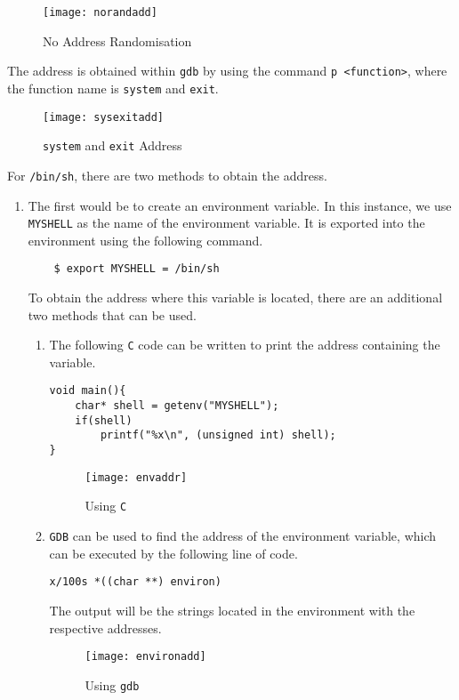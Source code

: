 \documentclass[a4paper,12pt]{article}
\begin{document}
\begin{figure}[H]
	\centering
	\texttt{[image: norandadd]}
	\caption{No Address Randomisation}
	\label{fig:norandadd}
\end{figure}
\noindent The address is obtained within \texttt{gdb} by using the command \texttt{p <function>}, where the function name is \texttt{system} and \texttt{exit}.
\begin{figure}[H]
	\centering
	\texttt{[image: sysexitadd]}
	\caption{\texttt{system} and \texttt{exit} Address}
	\label{fig:sysexitadd}
\end{figure}
For \texttt{/bin/sh}, there are two methods to obtain the address.
\begin{enumerate}
	\item The first would be to create an environment variable. In this instance, we use \texttt{MYSHELL} as the name of the environment variable. It is exported into the environment using the following command.
	\begin{verbatim}
	$ export MYSHELL = /bin/sh
	\end{verbatim}
	To obtain the address where this variable is located, there are an additional two methods that can be used.
	\begin{enumerate}
		\item The following \texttt{C} code can be written to print the address containing the variable.
		\begin{verbatim}
void main(){
    char* shell = getenv("MYSHELL");
    if(shell)
        printf("%x\n", (unsigned int) shell);
}
		\end{verbatim}
		
\begin{figure}[H]
	\centering
	\texttt{[image: envaddr]}
	\caption{Using \texttt{C}}
	\label{fig:envaddr}
\end{figure}
\item \texttt{GDB} can be used to find the address of the environment variable, which can be executed by the following line of code.
\begin{verbatim}
x/100s *((char **) environ)
\end{verbatim}
The output will be the strings located in the environment with the respective addresses.
\begin{figure}[H]
	\centering
	\texttt{[image: environadd]}
	\caption{Using \texttt{gdb}}
	\label{fig:environadd}
\end{figure}



\end{enumerate}
\end{enumerate}
\end{document}
